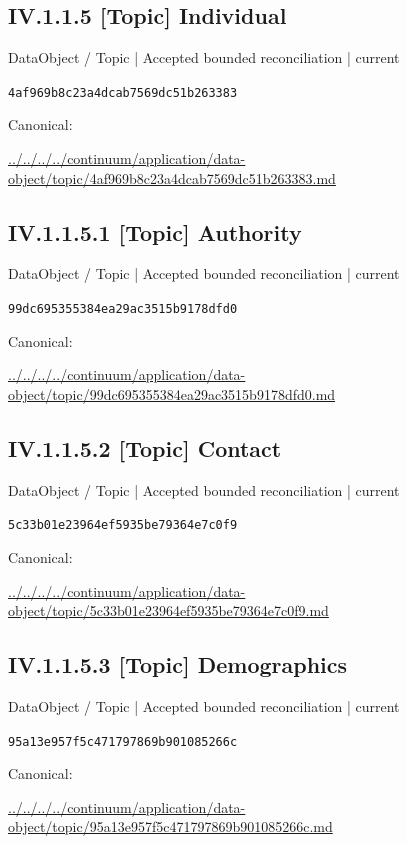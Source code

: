 \documentclass[10pt,a4paper]{article}
\begin{document}
\subsection*{IV.1.1.5 [Topic] Individual}
{\small DataObject / Topic | Accepted bounded reconciliation | current}\par
\texttt{4af969b8c23a4dcab7569dc51b263383}\par
Canonical: \par
{\footnotesize\url{../../../../continuum/application/data-object/topic/4af969b8c23a4dcab7569dc51b263383.md}}\par
\subsection*{IV.1.1.5.1 [Topic] Authority}
{\small DataObject / Topic | Accepted bounded reconciliation | current}\par
\texttt{99dc695355384ea29ac3515b9178dfd0}\par
Canonical: \par
{\footnotesize\url{../../../../continuum/application/data-object/topic/99dc695355384ea29ac3515b9178dfd0.md}}\par
\subsection*{IV.1.1.5.2 [Topic] Contact}
{\small DataObject / Topic | Accepted bounded reconciliation | current}\par
\texttt{5c33b01e23964ef5935be79364e7c0f9}\par
Canonical: \par
{\footnotesize\url{../../../../continuum/application/data-object/topic/5c33b01e23964ef5935be79364e7c0f9.md}}\par
\subsection*{IV.1.1.5.3 [Topic] Demographics}
{\small DataObject / Topic | Accepted bounded reconciliation | current}\par
\texttt{95a13e957f5c471797869b901085266c}\par
Canonical: \par
{\footnotesize\url{../../../../continuum/application/data-object/topic/95a13e957f5c471797869b901085266c.md}}\par
\end{document}
